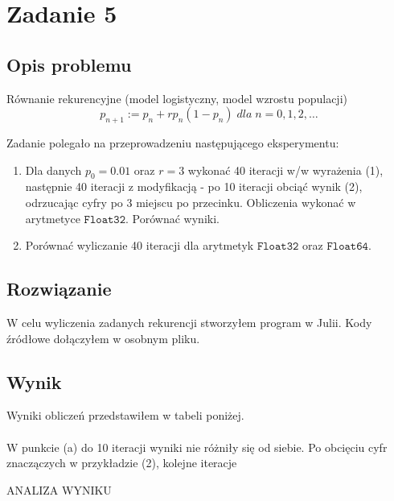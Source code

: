 \section{Zadanie 5}
\subsection{Opis problemu}
Równanie rekurencyjne (model logistyczny, model wzrostu populacji)
$$ p_{n+1} := p_n + rp_n(1 - p_n)\; dla\; n = 0, 1, 2,\ldots$$

Zadanie polegało na przeprowadzeniu następującego eksperymentu:
\begin{enumerate}[label=(\alph*)]
  \item Dla danych $ p_0 = 0.01 $ oraz $ r = 3 $ wykonać 40 iteracji w/w wyrażenia (1), następnie 40 iteracji z modyfikacją - po 10 iteracji obciąć wynik (2), odrzucając cyfry po 3 miejscu po przecinku. Obliczenia wykonać w arytmetyce $ \mathtt{Float32} $. Porównać wyniki.
  \item Porównać wyliczanie 40 iteracji dla arytmetyk $ \mathtt{Float32} $ oraz $ \mathtt{Float64} $.
\end{enumerate}
\subsection{Rozwiązanie}
W celu wyliczenia zadanych rekurencji stworzyłem program w Julii. Kody źródłowe dołączyłem w osobnym pliku.
\subsection{Wynik}
Wyniki obliczeń przedstawiłem w tabeli poniżej. \\\\
W punkcie (a) do 10 iteracji wyniki nie różniły się od siebie. Po obcięciu cyfr znaczączych w przykładzie (2), kolejne iteracje 

\begin{center}
    
\end{center}

ANALIZA WYNIKU